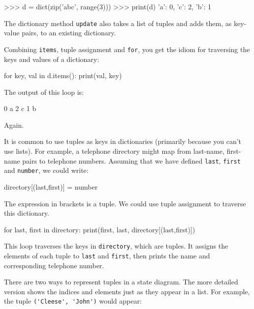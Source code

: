 \beforeverb
\begin{pycode}
>>> d = dict(zip('abc', range(3)))
>>> print(d)
{'a': 0, 'c': 2, 'b': 1}
\end{pycode}
\afterverb
%
The dictionary method {\tt update} also takes a list of tuples
and adds them, as key-value pairs, to an existing dictionary.



Combining {\tt items}, tuple assignment and {\tt for}, you
get the idiom for traversing the keys and values of a dictionary:

\beforeverb
\begin{pycode}
for key, val in d.items():
    print(val, key)
\end{pycode}
\afterverb
%
The output of this loop is:

\beforeverb
\begin{pyoutput}
0 a
2 c
1 b
\end{pyoutput}
\afterverb
%
Again.


It is common to use tuples as keys in dictionaries (primarily because
you can't use lists).  For example, a telephone directory might map
from last-name, first-name pairs to telephone numbers.  Assuming
that we have defined {\tt last}, {\tt first} and {\tt number}, we
could write:

\beforeverb
\begin{pycode}
directory[(last,first)] = number
\end{pycode}
\afterverb
%
The expression in brackets is a tuple.  We could use tuple
assignment to traverse this dictionary.


\beforeverb
\begin{pycode}
for last, first in directory:
    print(first, last, directory[(last,first)])
\end{pycode}
\afterverb
%
This loop traverses the keys in {\tt directory}, which are tuples.  It
assigns the elements of each tuple to {\tt last} and {\tt first}, then
prints the name and corresponding telephone number.

There are two ways to represent tuples in a state diagram.  The more
detailed version shows the indices and elements just as they appear in
a list.  For example, the tuple \verb"('Cleese', 'John')" would appear:

